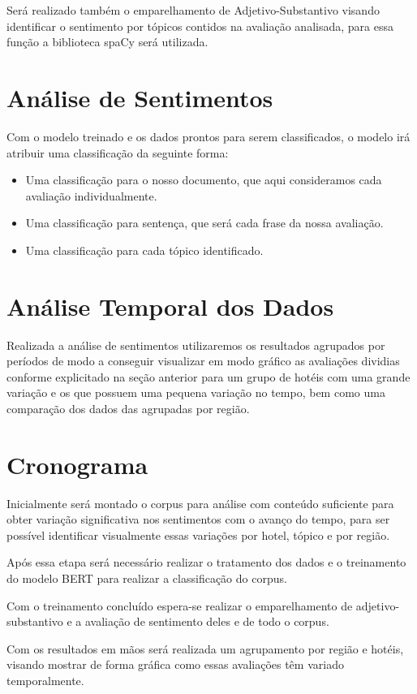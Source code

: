 Será realizado também o emparelhamento de Adjetivo-Substantivo visando identificar o sentimento por tópicos contidos na avaliação analisada, para essa função a biblioteca spaCy \cite{montani2022spacy} será utilizada. 

\section{Análise de Sentimentos}


Com o modelo treinado e os dados prontos para serem classificados, o modelo irá atribuir uma classificação da seguinte forma:
\begin{itemize}
    \item Uma classificação para o nosso documento, que aqui consideramos cada avaliação individualmente.
    \item Uma classificação para sentença, que será cada frase da nossa avaliação.
    \item Uma classificação para cada tópico identificado.
\end{itemize}

\section{Análise Temporal dos Dados}

Realizada a análise de sentimentos utilizaremos os resultados agrupados por períodos de modo a conseguir visualizar em modo gráfico as avaliações dividias conforme explicitado na seção anterior para um grupo de hotéis com uma grande variação e os que possuem uma pequena variação no tempo, bem como uma comparação dos dados das agrupadas por região.  

\section{Cronograma}

Inicialmente será montado o corpus para análise com conteúdo suficiente para obter variação significativa nos sentimentos com o avanço do tempo, para ser possível identificar visualmente essas variações por hotel, tópico e por região.

Após essa etapa será necessário realizar o tratamento dos dados e o treinamento do modelo BERT para realizar a classificação do corpus.

Com o treinamento concluído espera-se realizar o emparelhamento de adjetivo-substantivo e a avaliação de sentimento deles e de todo o corpus.

Com os resultados em mãos será realizada um agrupamento por região e hotéis, visando mostrar de forma gráfica como essas avaliações têm variado temporalmente.